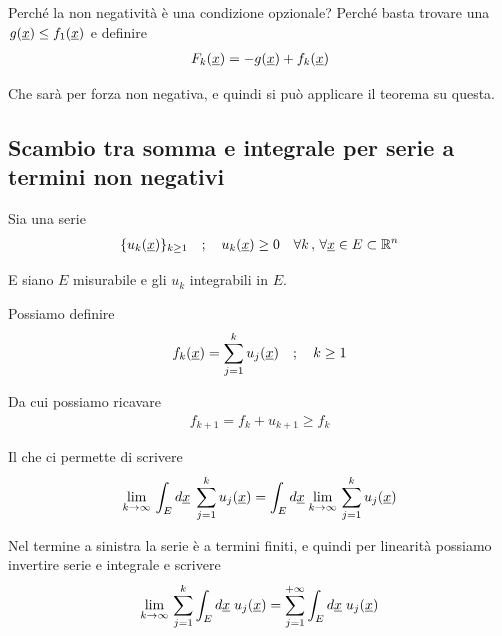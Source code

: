 Perché la non negatività è una condizione opzionale? Perché basta trovare una $g(\underline{x})\leq f_1(\underline{x})$ e definire
\begin{align}
	F_k(\underline{x})= -g(\underline{x}) + f_k(\underline{x})
\end{align}

Che sarà per forza non negativa, e quindi si può applicare il teorema su questa.

\begin{figure}[!htb]
\end{figure}

\newpage

\subsection{Scambio tra somma e integrale per serie a termini non negativi}

Sia una serie
\begin{align}
	\{u_k(\underline{x})\}_{k\geq 1} \quad ; \quad u_k(\underline{x}) \geq 0 \quad \forall k \, , \, \forall \underline{x} \in E \subset \mathbb{R}^n
\end{align}

E siano $E$ misurabile e gli $u_k$ integrabili in $E$. 

Possiamo definire
\begin{align}
	f_k(\underline{x}) = \sum_{j=1}^{k} u_j(\underline{x}) \quad ; \quad k \geq 1
\end{align}

Da cui possiamo ricavare
\begin{align}
	f_{k+1} = f_k + u_{k+1} \geq f_k
\end{align}

Il che ci permette di scrivere
\begin{align}
	\underset{k \rightarrow \infty}{\lim} \, \int_{E} d\underline{x} \; \sum_{j=1}^{k} u_j(\underline{x}) = 
	\int_{E} d\underline{x} \; \underset{k \rightarrow \infty}{\lim} \,\sum_{j=1}^{k} u_j(\underline{x})
\end{align}

Nel termine a sinistra la serie è a termini finiti, e quindi per linearità possiamo invertire serie e integrale e scrivere
\begin{align}
	\underset{k \rightarrow \infty}{\lim} \,  \sum_{j=1}^{k} \int_{E} d\underline{x} \; u_j(\underline{x}) = \sum_{j=1}^{+\infty} \int_{E} d\underline{x} \; u_j(\underline{x}) \end{align}

